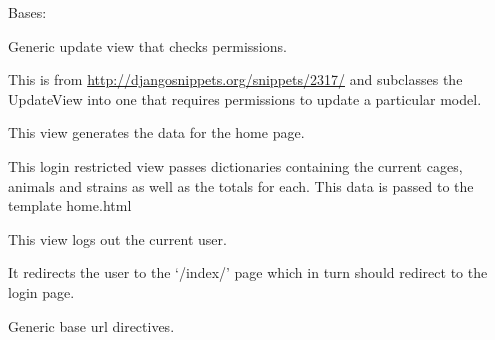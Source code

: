 \documentclass[letterpaper,10pt,english]{sphinxmanual}
\begin{document}
\begin{fulllineitems}
\label{api:mousedb.views.RestrictedUpdateView}
Bases: 

Generic update view that checks permissions.

This is from \href{http://djangosnippets.org/snippets/2317/}{http://djangosnippets.org/snippets/2317/} and subclasses the UpdateView into one that requires permissions to update a particular model.


\begin{fulllineitems}
\label{api:mousedb.views.RestrictedUpdateView.dispatch}
\end{fulllineitems}


\end{fulllineitems}



\begin{fulllineitems}
\label{api:mousedb.views.home}
This view generates the data for the home page.

This login restricted view passes dictionaries containing the current cages, animals and strains as well as the totals for each.  This data is passed to the template home.html

\end{fulllineitems}



\begin{fulllineitems}
\label{api:mousedb.views.logout_view}
This view logs out the current user.

It redirects the user to the `/index/' page which in turn should redirect to the login page.

\end{fulllineitems}

\label{api:module-mousedb.urls}
Generic base url directives.
\end{document}
